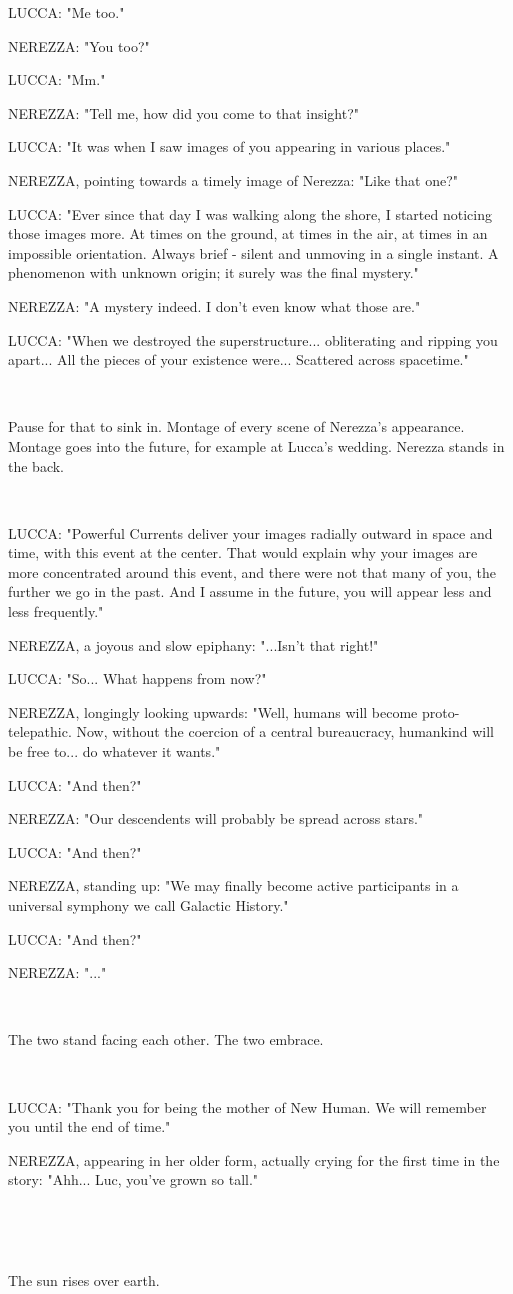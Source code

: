 \documentclass[11pt]{article}
\begin{document}
LUCCA: "Me too."

NEREZZA: "You too?"

LUCCA: "Mm."

NEREZZA: "Tell me, how did you come to that insight?"

LUCCA: "It was when I saw images of you appearing in various places."

NEREZZA, pointing towards a timely image of Nerezza: "Like that one?"

LUCCA: "Ever since that day I was walking along the shore, I started noticing those images more.
At times on the ground, at times in the air, at times in an impossible orientation. 
Always brief - silent and unmoving in a single instant.
A phenomenon with unknown origin; it surely was the final mystery."

NEREZZA: "A mystery indeed. 
I don't even know what those are."

LUCCA: "When we destroyed the superstructure... obliterating and ripping you apart...
All the pieces of your existence were... 
Scattered across spacetime."

\ 

Pause for that to sink in.
Montage of every scene of Nerezza's appearance.
Montage goes into the future, for example at Lucca's wedding.
Nerezza stands in the back.

\ 

LUCCA: "Powerful Currents deliver your images radially outward in space and time, with this event at the center.
That would explain why your images are more concentrated around this event, and there were not that many of you, the further we go in the past.
And I assume in the future, you will appear less and less frequently."

NEREZZA, a joyous and slow epiphany: "...Isn't that right!"

LUCCA: "So... What happens from now?"

NEREZZA, longingly looking upwards: "Well, humans will become proto-telepathic. 
Now, without the coercion of a central bureaucracy, humankind will be free to... do whatever it wants."

LUCCA: "And then?"

NEREZZA: "Our descendents will probably be spread across stars."

LUCCA: "And then?"

NEREZZA, standing up: "We may finally become active participants in a universal symphony we call Galactic History."

LUCCA: "And then?"

NEREZZA: "..."

\ 

The two stand facing each other.
The two embrace. 

\ 

LUCCA: "Thank you for being the mother of New Human.
We will remember you until the end of time."

NEREZZA, appearing in her older form, actually crying for the first time in the story: "Ahh... Luc, you've grown so tall."

\ 

\ 

The sun rises over earth.
\end{document}
